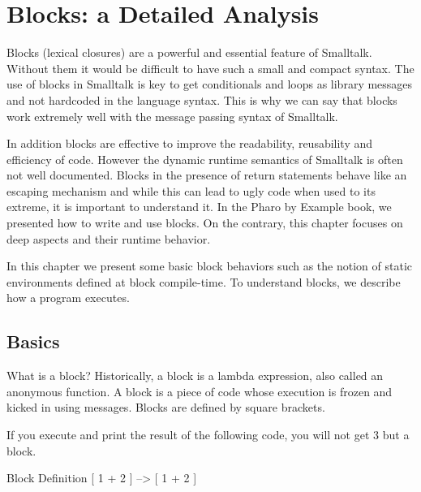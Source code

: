 \documentclass[a4paper,10pt,twoside]{book}
\begin{document}
\fi
\sloppy
\chapter{Blocks: a Detailed Analysis}


Blocks (lexical closures) are a powerful and essential feature of Smalltalk. Without them it
would be difficult to have such a small and compact syntax. The use of blocks in Smalltalk
is key to get conditionals and loops as library messages and not hardcoded in the language syntax. This is why we can say that
blocks work extremely well with the message passing syntax of Smalltalk.

In addition blocks are  effective to improve the readability, reusability and efficiency of code.
However the dynamic runtime semantics of Smalltalk is often not well documented. Blocks in the presence of return statements behave like an escaping mechanism and while this can lead to ugly code when used to its extreme, it is important to understand it. In the Pharo by Example book, we presented how to write and use blocks. On the contrary, this chapter focuses on deep aspects and their runtime behavior.

In this chapter we present some basic block behaviors such as the notion of static environments defined at block compile-time. To understand blocks, we describe how  a program executes.

\section{Basics}

What is a block? Historically, a block is a lambda expression, also called an anonymous function. A block is a piece of code whose execution is frozen and kicked in using messages. Blocks are defined by square brackets.

If you execute and print the result of the following code, you will not get 3 but a block.

\begin{code}{Block Definition}
[ 1 + 2 ] --> [ 1 + 2 ]
\end{code}
\end{document}

